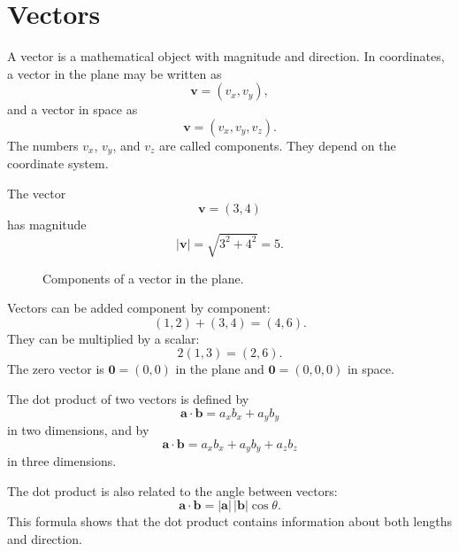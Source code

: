 \section{Vectors}

A vector is a mathematical object with magnitude and direction. In coordinates, a vector in the plane may be written as
\[
\mathbf{v}=(v_x,v_y),
\]
and a vector in space as
\[
\mathbf{v}=(v_x,v_y,v_z).
\]
The numbers \(v_x\), \(v_y\), and \(v_z\) are called components. They depend on the coordinate system.

\begin{examplebox}
The vector
\[
\mathbf{v}=(3,4)
\]
has magnitude
\[
|\mathbf{v}|=\sqrt{3^2+4^2}=5.
\]
\end{examplebox}

\begin{figure}[htbp]
\centering

\caption{Components of a vector in the plane.}
\label{fig:mathematical-foundations-vector-components}
\end{figure}

Vectors can be added component by component:
\[
(1,2)+(3,4)=(4,6).
\]
They can be multiplied by a scalar:
\[
2(1,3)=(2,6).
\]
The zero vector is \(\mathbf{0}=(0,0)\) in the plane and \(\mathbf{0}=(0,0,0)\) in space.

The dot product of two vectors is defined by
\[
\mathbf{a}\cdot\mathbf{b}=a_xb_x+a_yb_y
\]
in two dimensions, and by
\[
\mathbf{a}\cdot\mathbf{b}=a_xb_x+a_yb_y+a_zb_z
\]
in three dimensions.

The dot product is also related to the angle between vectors:
\[
\mathbf{a}\cdot\mathbf{b}=|\mathbf{a}|\,|\mathbf{b}|\cos\theta.
\]
This formula shows that the dot product contains information about both lengths and direction.
